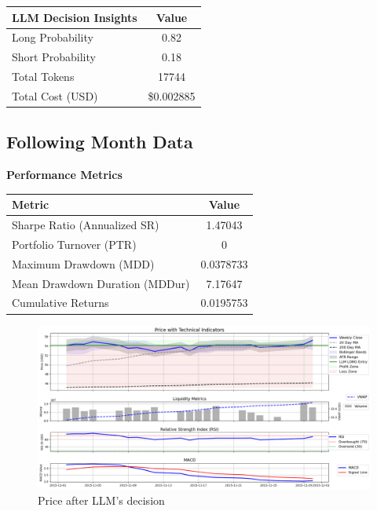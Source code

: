 \documentclass[8pt]{scrartcl}
\begin{document}
\begin{longtable}{l c}
\toprule
\textbf{LLM Decision Insights} & \textbf{Value} \\
\midrule
Long Probability & 0.82 \\
Short Probability & 0.18 \\
\midrule
Total Tokens & 17744 \\
Total Cost (USD) & \$0.002885 \\
\bottomrule
\end{longtable}

\subsection*{Following Month Data}

\textbf{Performance Metrics}

\begin{longtable}{l c}
\toprule
\textbf{Metric} & \textbf{Value} \\
\midrule
Sharpe Ratio (Annualized SR) & 1.47043 \\
Portfolio Turnover (PTR) & 0 \\
Maximum Drawdown (MDD) & 0.0378733 \\
Mean Drawdown Duration (MDDur) & 7.17647 \\
Cumulative Returns & 0.0195753 \\
\bottomrule
\end{longtable}


\begin{figure}[H]
    \centering
    \includegraphics[width=1\linewidth]{judge_reviews/MSFT_M_gpt-4o-mini//2015-11-01/llm_Price_with_Technical_Indicators.png}
    \caption{Price after LLM's decision}
\end{figure}
\end{document}
